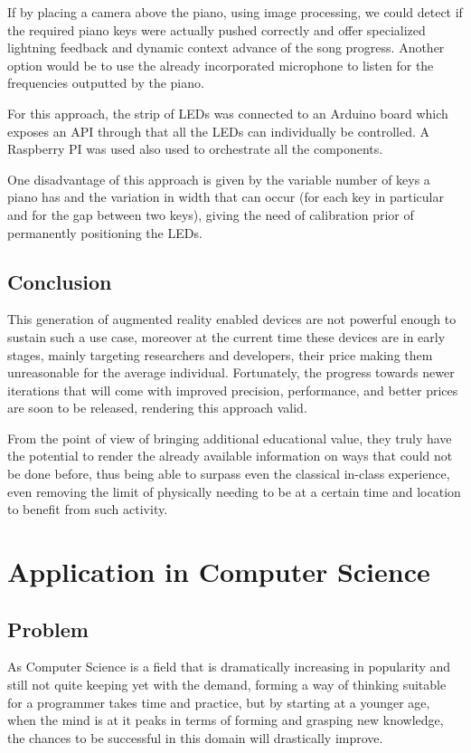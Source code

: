 \documentclass[12 pct]{report}
\begin{document}
If by placing a camera above the piano, using image processing, we could detect if the required piano keys were actually pushed correctly and offer specialized lightning feedback and dynamic context advance of the song progress. Another option would be to use the already incorporated microphone to listen for the frequencies outputted by the piano.

For this approach, the strip of LEDs was connected to an Arduino board which exposes an API through that all the LEDs can individually be controlled. A Raspberry PI was used also used to orchestrate all the components.

One disadvantage of this approach is given by the variable number of keys a piano has and the variation in width that can occur (for each key in particular and for the gap between two keys), giving the need of calibration prior of permanently positioning the LEDs.

\section{Conclusion}
This generation of augmented reality enabled devices are not powerful enough to sustain such a use case, moreover at the current time these devices are in early stages, mainly targeting researchers and developers, their price making them unreasonable for the average individual. Fortunately, the progress towards newer iterations that will come with improved precision, performance, and better prices are soon to be released, rendering this approach valid.

From the point of view of bringing additional educational value, they truly have the potential to render the already available information on ways that could not be done before, thus being able to surpass even the classical in-class experience, even removing the limit of physically needing to be at a certain  time and location to benefit from such activity.

\chapter{Application in Computer Science}

\section{Problem}
As Computer Science is a field that is dramatically increasing in popularity and still not quite keeping yet with the demand, forming a way of thinking suitable for a programmer takes time and practice, but by starting at a younger age, when the mind is at it peaks in terms of forming and grasping new knowledge, the chances to be successful in this domain will drastically improve.
\end{document}
